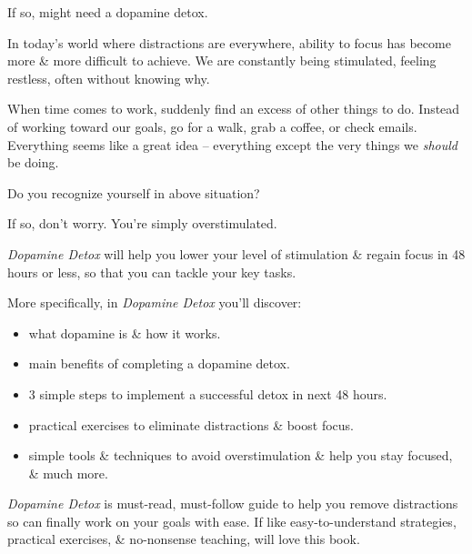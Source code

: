 \documentclass{article}
\begin{document}
\begin{enumerate}
	If so, might need a dopamine detox.

	In today's world where distractions are everywhere, ability to focus has become more \& more difficult to achieve. We are constantly being stimulated, feeling restless, often without knowing why.

	When time comes to work, suddenly find an excess of other things to do. Instead of working toward our goals, go for a walk, grab a coffee, or check emails. Everything seems like a great idea -- everything except the very things we {\it should} be doing.

	Do you recognize yourself in above situation?

	If so, don't worry. You're simply overstimulated.

	{\it Dopamine Detox} will help you lower your level of stimulation \& regain focus in 48 hours or less, so that you can tackle your key tasks.

	More specifically, in {\it Dopamine Detox} you'll discover:
	\begin{itemize}
		\item what dopamine is \& how it works.
		\item main benefits of completing a dopamine detox.
		\item 3 simple steps to implement a successful detox in next 48 hours.
		\item practical exercises to eliminate distractions \& boost focus.
		\item simple tools \& techniques to avoid overstimulation \& help you stay focused, \& much more.
	\end{itemize}
	{\it Dopamine Detox} is must-read, must-follow guide to help you remove distractions so can finally work on your goals with ease. If like easy-to-understand strategies, practical exercises, \& no-nonsense teaching, will love this book.


\end{enumerate}
\end{document}
